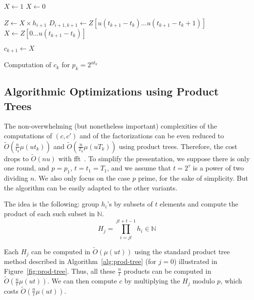 \documentclass[11pt]{llncs}
\newcommand{\Oapp}{\ensuremath{\tilde{O}}}
\begin{document}
\begin{algorithm}
\newcommand{\vstart}{\ensuremath{\mathrm{start}}}
\newcommand{\vmid}{\ensuremath{\mathrm{mid}}}
\newcommand{\vend}{\ensuremath{\mathrm{end}}}
\begin{algorithmic}[1]

  \State $X \gets 1$
\Else
  \State $X \gets 0$
\EndIf

  \State $Z \gets X \times h_{i+1}$
  \State $D_{i+1,k+1} \gets Z[u(t_{k+1}-t_k)\dots u(t_{k+1}-t_k+1)]$
  \State $X \gets Z[0\dots u(t_{k+1}-t_k)]$
\EndFor

\State $c_{k+1} \gets X$
\end{algorithmic}
\caption{Computation of $c_k$ for $p_k = 2^{ut_k}$}\label{alg:even-p-c}
\end{algorithm}

\subsection{Algorithmic Optimizations using Product Trees}
\label{sec:algo-opt-prod-trees}

The non-overwhelming (but nonetheless important) complexities of the computations of $(c,c')$ and of the factorizations can be even reduced to $\Oapp(\frac{n}{t_k} \mu(u t_k))$ and $\Oapp(\frac{n}{T_k} \mu(u T_k))$ using product trees. 
Therefore, the cost drops to $\Oapp(n u)$ with {\sc fft}~\cite{schonhage1971schnelle}. 
To simplify the presentation, we suppose there is only one round, and $p=p_1$, $t=t_1=T_1$, and we assume that $t=2^\tau$ is a power of two dividing $n$.
We also only focus on the case $p$ prime, for the sake of simplicity.
But the algorithm can be easily adapted to the other variants.

The idea is the following: group $h_i$'s by subsets of $t$ elements and compute the product of each such subset in $\mathbb{N}$.
\[ H_j = \prod_{i=j t}^{j t + t - 1} h_i\in\mathbb{N} \]

Each $H_j$ can be computed in $\Oapp(\mu(u t))$ using the standard product tree method described in Algorithm~\ref{alg:prod-tree} (for $j=0$) illustrated in Figure~\ref{fig:prod-tree}.
Thus, all these $\frac{n}{t}$ products can be computed in $\Oapp(\frac{n}{t} \mu(u t))$. We can then compute $c$ by multiplying the $H_j$ modulo $p$, which costs $\Oapp(\frac{n}{t} \mu(u t))$.\smallskip
\end{document}
